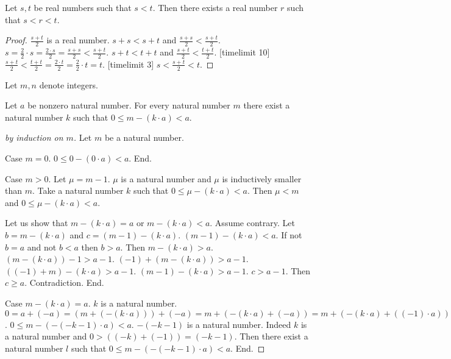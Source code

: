 \documentclass{article}
\begin{document}
\begin{forthel}

\begin{lemma}
Let $s,t$ be real numbers such that $s < t$.
Then there exists a real number $r$ such that $s < r < t$.
\end{lemma}
\begin{proof}
$\frac{s+t}{2}$ is a real number. $s + s < s + t$ and $\frac{s + s}{2} < \frac{s + t}{2}$.
$s = \frac{2}{2} \cdot s = \frac{2 \cdot s}{2} = \frac{s + s}{2} < \frac{s + t}{2}$.
$s + t < t + t$ and $\frac{s + t}{2} < \frac{t + t}{2}$.
[timelimit 10]
$\frac{s+t}{2} < \frac{t+t}{2} = \frac{2 \cdot t}{2} = \frac{2}{2} \cdot t = t$.
[timelimit 3]
$s < \frac{s+t}{2} < t$.
\end{proof}



Let $m,n$ denote integers.


\begin{proposition}
Let $a$ be nonzero natural number.
For every natural number $m$ there exist
a natural number $k$ such that $0 \leq m - (k \cdot a) < a$.
\end{proposition}
\begin{proof}[by induction on $m$]
Let $m$ be a natural number.

Case $m = 0$.
$0 \leq 0 - (0 \cdot a) < a$. End.

Case $m > 0$. Let $\mu = m-1$.
$\mu$ is a natural number and $\mu$ is inductively smaller than $m$.
Take a natural number $k$ such that $0 \leq \mu - (k \cdot a) < a$.
Then $\mu < m$ and $0 \leq \mu - (k \cdot a) <  a$.

Let us show that $m - (k \cdot a) = a$ or $m - (k \cdot a) < a$.
Assume contrary.
Let $b = m - (k \cdot a)$ and $c = (m-1) - (k \cdot a)$.
$(m-1) - (k \cdot a) < a$.
If not $b = a$ and not $b < a$ then $b > a$.
Then $m - (k \cdot a) > a$.
$(m - (k \cdot a)) - 1 > a - 1$.
$(-1) + (m - (k\cdot a)) > a - 1$.
$((-1) + m) - (k \cdot a) > a - 1$.
$(m-1) - (k \cdot a) > a - 1$.
$c > a-1$.
Then $c \geq a$.
Contradiction.
End.

Case $m - (k \cdot a) = a$. 
$k$ is a natural number.
$0 = 
a + (-a) = 
(m + (-(k \cdot a))) + (-a) =
m + (-(k \cdot a) + (-a)) = 
m + (-(k \cdot a) + ((-1) \cdot a)) = 
m + (((-k) \cdot a) + ((-1) \cdot a)) =
m + (((-k)+(-1)) \cdot a) = 
m + ((-k-1) \cdot a) =
m - (-(-k-1) \cdot a)$. 
$0 \leq m - (-(-k-1) \cdot a) < a$. 
$-(-k-1)$ is a natural number. 
Indeed $k$ is a natural number and $0 > ((-k) + (-1)) = (-k-1)$.
Then there exist a natural number $l$ such that
$0 \leq m - (-(-k-1) \cdot a) < a$.
End.


\end{proof}
\end{forthel}
\end{document}

